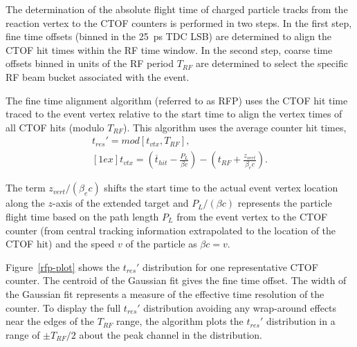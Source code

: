 \documentclass[3p,times,twocolumn]{elsarticle}
\begin{document}
The determination of the absolute flight time of charged particle tracks from the reaction vertex to the
CTOF counters is performed in two steps. In the first step, fine time offsets (binned in the 25~ps TDC
LSB) are determined to align the CTOF hit times within the RF time window. In the second step, coarse
time offsets binned in units of the RF period $T_{RF}$ are determined to select the specific RF beam
bucket associated with the event.

The fine time alignment algorithm (referred to as RFP) uses the CTOF hit time traced to the event vertex
relative to the start time to align the vertex times of all CTOF hits (modulo $T_{RF}$). This algorithm uses
the average counter hit times, 
\begin{eqnarray}
t_{res}' = mod \left[ t_{vtx}, T_{RF} \right], ~~~~~\\ [1ex]
t_{vtx} = \left(\overline{t}_{hit} - \frac{P_L}{\beta c} \right) - 
\left(t_{RF} + \frac{z_{vert}}{\beta_e c} \right). \nonumber
\end{eqnarray}

\noindent
The term $z_{vert}/(\beta_e c)$ shifts the start time to the actual event vertex location along the
$z$-axis of the extended target and $P_L/(\beta c)$ represents the particle flight time based on the
path length $P_L$ from the event vertex to the CTOF counter (from central tracking information
extrapolated to the location of the CTOF hit) and the speed $v$ of the particle as $\beta c = v$.

Figure~\ref{rfp-plot} shows the $t_{res}'$ distribution for one representative CTOF counter. The
centroid of the Gaussian fit gives the fine time offset. The width of the Gaussian fit represents
a measure of the effective time resolution of the counter. To display the full $t_{res}'$ distribution
avoiding any wrap-around effects near the edges of the $T_{RF}$ range, the algorithm plots the
$t_{res}'$ distribution in a range of $\pm T_{RF}/2$ about the peak channel in the distribution.
\end{document}
